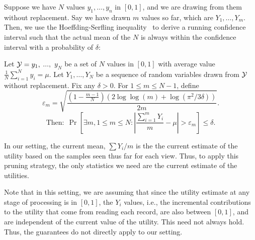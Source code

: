 Suppose we have $N$ values $y_1, \ldots, y_n$ in $[0, 1]$, and we are drawing
from them without replacement. 
Say we have drawn $m$ values so far, which are $Y_1, \ldots, Y_m$.
Then, we use the Hoeffding-Serfling inequality~\cite{serfling1974probability} 
to derive a running 
confidence interval such that the actual mean of the $N$
is always within the confidence interval with a probability of $\delta$:
\begin{theorem}
\label{thm:hs}
Let $\mathcal{Y} = y_1,$ $\ldots,$ $y_N$ be a set of $N$ 
values in $[0,1]$ with average value
$\frac1N \sum_{i=1}^N y_i = \mu$.
Let $Y_1,\ldots,Y_N$ be a 
sequence of random variables drawn from $\mathcal{Y}$ without
replacement.
Fix any $\delta > 0$. For $1 \le m \le N-1$, define
$$
\varepsilon_m = \sqrt{\frac{(1-\frac{m-1}N)(2\log \log (m) + \log(\pi^2/3\delta))}{2m}}.
$$
$$
\textrm{Then:} \ \   \Pr\left[ \exists m, 1 \le m \le N : 
  \left|\frac{\sum_{i=1}^m Y_i}{m} - \mu\right| > \varepsilon_m \right] 
\le \delta.
$$
\end{theorem}
In our setting, the current mean, $\sum Y_i / m$ is the 
the current estimate of the utility based on the samples seen thus far
for each view. 
Thus, to apply this pruning strategy, the only statistics
we need are the current estimate of the utilities.

Note that in this setting, we are assuming that since the
utility estimate at any stage of processing is in $[0, 1]$, 
the $Y_i$ values, i.e., the incremental contributions to the utility
that come from reading each record, are also between $[0, 1]$,
and are independent of the current value of the utility. 
This need not always hold. 
Thus, the guarantees do not directly apply to our setting. 





